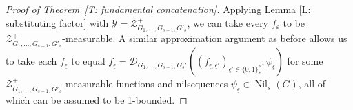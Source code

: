 \documentclass[11pt]{amsart}
\theoremstyle{definition}
\newcommand{\CY}{{\mathcal Y}}
\newcommand{\veps}{\varepsilon}
\newcommand{\ueps}{{\underline{\epsilon}}}
\newcommand{\1}{{\mathbf{1}}}
\DeclareMathOperator{\Nil}{Nil}
\begin{document}
\begin{proof}[Proof of Theorem~\ref{T: fundamental concatenation}]
Applying Lemma \ref{L: substituting factor} with $\CY =  \mathcal{Z}^+_{G_1,\dots,G_{s-1},G'_s}$,
we can take every $f_\veps$ to be $\mathcal{Z}^+_{G_1,\dots,G_{s-1},G'_s}$-measurable. 
A similar approximation argument as before allows us to take each $f_\ueps$ to equal
$f_{\ueps}=\mathcal{D}_{G_1,\dots,G_{s-1},G_{s}'}((f_{\ueps,\ueps'})_{\ueps'\in\{0,1\}^{s}_{\ast}}; \psi_{\ueps})$ for some $\mathcal{Z}^+_{G_1,\dots,G_{s-1},G'_s}$-measurable functions and nilsequences $\psi_\ueps\in\Nil_s(G)$, all of which can be assumed to be 1-bounded. 


\end{proof}
\end{document}
